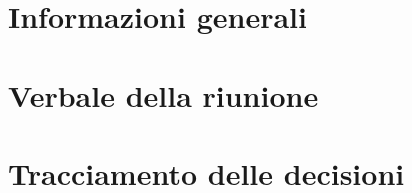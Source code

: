 \documentclass[a4paper, oneside, openany, dvipsnames, table]{article}
\begin{document}
    \copertina{}

    
    
    \newpage
    \tableofcontents
    
    \newpage
    \section{Informazioni generali}\label{sec:informazioni-generali}
    
    
    \newpage
    \section{Verbale della riunione}\label{sec:verbale-della-riunione}
    
    
    \newpage
    \section{Tracciamento delle decisioni}\label{sec:tracciamento-delle-decisioni}
    
\end{document}
